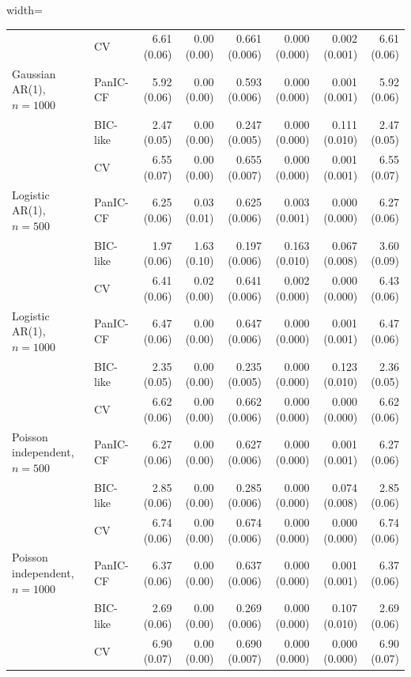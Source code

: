 \begin{table}[H]
\begin{adjustbox}{width=\textwidth}
\begin{tabular}{llrrrrrr}
 & CV & 6.61 (0.06) & 0.00 (0.00) & 0.661 (0.006) & 0.000 (0.000) & 0.002 (0.001) & 6.61 (0.06) \\
Gaussian AR(1), $n=1000$ & PanIC-CF & 5.92 (0.06) & 0.00 (0.00) & 0.593 (0.006) & 0.000 (0.000) & 0.001 (0.001) & 5.92 (0.06) \\
 & BIC-like & 2.47 (0.05) & 0.00 (0.00) & 0.247 (0.005) & 0.000 (0.000) & 0.111 (0.010) & 2.47 (0.05) \\
 & CV & 6.55 (0.07) & 0.00 (0.00) & 0.655 (0.007) & 0.000 (0.000) & 0.001 (0.001) & 6.55 (0.07) \\
Logistic AR(1), $n=500$ & PanIC-CF & 6.25 (0.06) & 0.03 (0.01) & 0.625 (0.006) & 0.003 (0.001) & 0.000 (0.000) & 6.27 (0.06) \\
 & BIC-like & 1.97 (0.06) & 1.63 (0.10) & 0.197 (0.006) & 0.163 (0.010) & 0.067 (0.008) & 3.60 (0.09) \\
 & CV & 6.41 (0.06) & 0.02 (0.00) & 0.641 (0.006) & 0.002 (0.000) & 0.000 (0.000) & 6.43 (0.06) \\
Logistic AR(1), $n=1000$ & PanIC-CF & 6.47 (0.06) & 0.00 (0.00) & 0.647 (0.006) & 0.000 (0.000) & 0.001 (0.001) & 6.47 (0.06) \\
 & BIC-like & 2.35 (0.05) & 0.00 (0.00) & 0.235 (0.005) & 0.000 (0.000) & 0.123 (0.010) & 2.36 (0.05) \\
 & CV & 6.62 (0.06) & 0.00 (0.00) & 0.662 (0.006) & 0.000 (0.000) & 0.000 (0.000) & 6.62 (0.06) \\
Poisson independent, $n=500$ & PanIC-CF & 6.27 (0.06) & 0.00 (0.00) & 0.627 (0.006) & 0.000 (0.000) & 0.001 (0.001) & 6.27 (0.06) \\
 & BIC-like & 2.85 (0.06) & 0.00 (0.00) & 0.285 (0.006) & 0.000 (0.000) & 0.074 (0.008) & 2.85 (0.06) \\
 & CV & 6.74 (0.06) & 0.00 (0.00) & 0.674 (0.006) & 0.000 (0.000) & 0.000 (0.000) & 6.74 (0.06) \\
Poisson independent, $n=1000$ & PanIC-CF & 6.37 (0.06) & 0.00 (0.00) & 0.637 (0.006) & 0.000 (0.000) & 0.001 (0.001) & 6.37 (0.06) \\
 & BIC-like & 2.69 (0.06) & 0.00 (0.00) & 0.269 (0.006) & 0.000 (0.000) & 0.107 (0.010) & 2.69 (0.06) \\
 & CV & 6.90 (0.07) & 0.00 (0.00) & 0.690 (0.007) & 0.000 (0.000) & 0.000 (0.000) & 6.90 (0.07) \\
\hline
\end{tabular}
\end{adjustbox}
\end{table}

